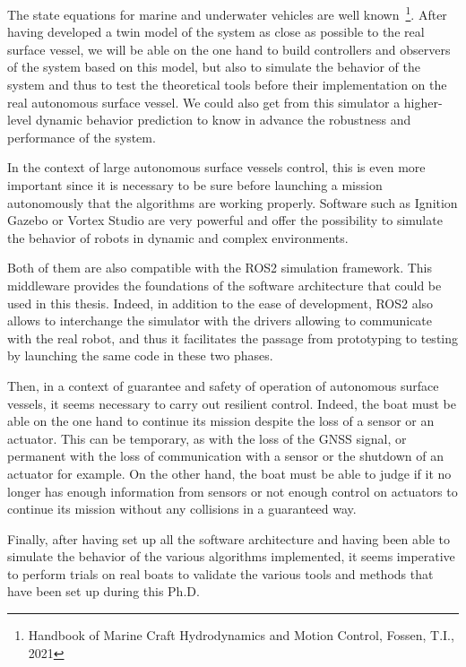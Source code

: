 \documentclass[11pt, a4paper]{awesome-cv}
\begin{document}
\begin{cvletter}
			The state equations for marine and underwater vehicles are well known~\footnote{Handbook of Marine Craft Hydrodynamics and Motion Control, Fossen, T.I., 2021}. After having developed a twin model of the system as close as possible to the real surface vessel, we will be able on the one hand to build controllers and observers of the system based on this model, but also to simulate the behavior of the system and thus to test the theoretical tools before their implementation on the real autonomous surface vessel. We could also get from this simulator a higher-level dynamic behavior prediction to know in advance the robustness and performance of the system.
			
			In the context of large autonomous surface vessels control, this is even more important since it is necessary to be sure before launching a mission autonomously that the algorithms are working properly. Software such as Ignition Gazebo or Vortex Studio are very powerful and offer the possibility to simulate the behavior of robots in dynamic and complex environments.
			
			Both of them are also compatible with the ROS2 simulation framework. This middleware provides the foundations of the software architecture that could be used in this thesis. Indeed, in addition to the ease of development, ROS2 also allows to interchange the simulator with the drivers allowing to communicate with the real robot, and thus it facilitates the passage from prototyping to testing by launching the same code in these two phases.
			
			Then, in a context of guarantee and safety of operation of autonomous surface vessels, it seems necessary to carry out resilient control. Indeed, the boat must be able on the one hand to continue its mission despite the loss of a sensor or an actuator. This can be temporary, as with the loss of the GNSS signal, or permanent with the loss of communication with a sensor or the shutdown of an actuator for example. On the other hand, the boat must be able to judge if it no longer has enough information from sensors or not enough control on actuators to continue its mission without any collisions in a guaranteed way.
		 
			Finally, after having set up all the software architecture and having been able to simulate the behavior of the various algorithms implemented, it seems imperative to perform trials on real boats to validate the various tools and methods that have been set up during this Ph.D.
		

\end{cvletter}
\end{document}
